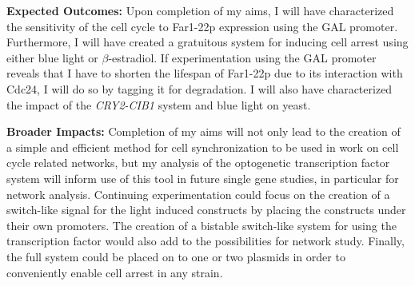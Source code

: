 \documentclass[12pt]{article}
\begin{document}

\textbf{Expected Outcomes:} 
Upon completion of my aims, I will have characterized the sensitivity of the cell cycle to Far1-22p expression using the GAL promoter. Furthermore, I will have created a gratuitous system for inducing cell arrest using either blue light or $\beta$-estradiol. If experimentation using the GAL promoter reveals that I have to shorten the lifespan of Far1-22p due to its interaction with Cdc24, I will do so by tagging it for degradation. I will also have characterized the impact of the \emph{CRY2-CIB1} system and blue light on yeast.

\textbf{Broader Impacts:}
Completion of my aims will not only lead to the creation of a simple and efficient method for cell synchronization to be used in work on cell cycle related networks, but my analysis of the optogenetic transcription factor system will inform use of this tool in future single gene studies, in particular for network analysis. Continuing experimentation could focus on the creation of a switch-like signal for the light induced constructs by placing the constructs under their own promoters. The creation of a bistable switch-like system for using the transcription factor would also add to the possibilities for network study. Finally, the full system could be placed on to one or two plasmids in order to conveniently enable cell arrest in any strain.
\end{document}
